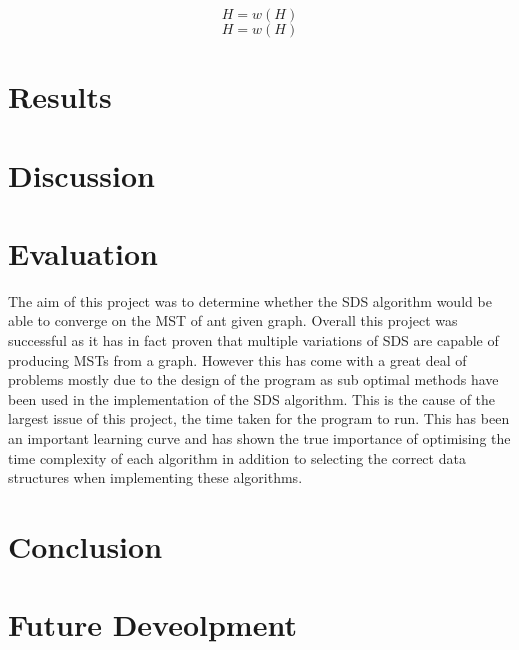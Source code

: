\documentclass{AISB2008}
\begin{document}
\begin{equation}
H = w(H)
\end{equation}
\begin{equation}
H = w(H)
\end{equation}
\section{Results}




\section{Discussion}



\section{Evaluation}

The aim of this project was to determine whether the SDS algorithm would be able to converge on the MST of ant given graph. Overall this project was successful as it has in fact proven that multiple variations of SDS are capable of producing MSTs from a graph. However this has come with a great deal of problems mostly due to the design of the program as sub optimal methods have been used in the implementation of the SDS algorithm. This is the cause of the largest issue of this project, the time taken for the program to run. This has been an important learning curve and has shown the true importance of optimising the time complexity of each algorithm in addition to selecting the correct data structures when implementing these algorithms.


\section{Conclusion}



\section{Future Deveolpment}
\end{document}
